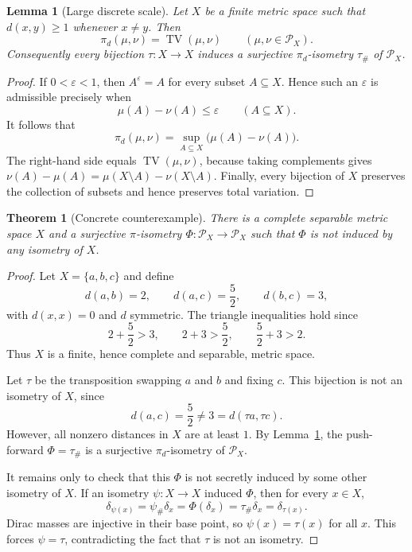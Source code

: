 \documentclass[11pt]{article}
\newtheorem{theorem}{Theorem}
\newtheorem{lemma}{Lemma}
\newcommand{\PX}{\mathcal P_X}
\newcommand{\TV}{\operatorname{TV}}
\begin{document}
\begin{lemma}[Large discrete scale]\label{lem:tv}
Let \(X\) be a finite metric space such that \(d(x,y)\ge 1\) whenever
\(x\ne y\).  Then
\[
  \pi_d(\mu,\nu)=\TV(\mu,\nu)\qquad(\mu,\nu\in\PX).
\]
Consequently every bijection \(\tau:X\to X\) induces a surjective
\(\pi_d\)-isometry \(\tau_\#\) of \(\PX\).
\end{lemma}

\begin{proof}
If \(0<\varepsilon<1\), then \(A^\varepsilon=A\) for every subset \(A\subseteq
X\).  Hence such an \(\varepsilon\) is admissible precisely when
\[
  \mu(A)-\nu(A)\le \varepsilon\qquad(A\subseteq X).
\]
It follows that
\[
  \pi_d(\mu,\nu)=\sup_{A\subseteq X}\bigl(\mu(A)-\nu(A)\bigr).
\]
The right-hand side equals \(\TV(\mu,\nu)\), because taking complements gives
\(\nu(A)-\mu(A)=\mu(X\setminus A)-\nu(X\setminus A)\).  Finally, every
bijection of \(X\) preserves the collection of subsets and hence preserves
total variation.
\end{proof}

\begin{theorem}[Concrete counterexample]\label{thm:counterexample}
There is a complete separable metric space \(X\) and a surjective
\(\pi\)-isometry \(\Phi:\PX\to\PX\) such that \(\Phi\) is not induced by any
isometry of \(X\).
\end{theorem}

\begin{proof}
Let \(X=\{a,b,c\}\) and define
\[
  d(a,b)=2,\qquad d(a,c)=\frac52,\qquad d(b,c)=3,
\]
with \(d(x,x)=0\) and \(d\) symmetric.  The triangle inequalities hold since
\[
  2+\frac52>3,\qquad 2+3>\frac52,\qquad \frac52+3>2.
\]
Thus \(X\) is a finite, hence complete and separable, metric space.

Let \(\tau\) be the transposition swapping \(a\) and \(b\) and fixing \(c\).
This bijection is not an isometry of \(X\), since
\[
  d(a,c)=\frac52\ne 3=d(\tau a,\tau c).
\]
However, all nonzero distances in \(X\) are at least \(1\).  By
Lemma~\ref{lem:tv}, the push-forward \(\Phi=\tau_\#\) is a surjective
\(\pi_d\)-isometry of \(\PX\).

It remains only to check that this \(\Phi\) is not secretly induced by some
other isometry of \(X\).  If an isometry \(\psi:X\to X\) induced \(\Phi\), then
for every \(x\in X\),
\[
  \delta_{\psi(x)}
  =\psi_\#\delta_x
  =\Phi(\delta_x)
  =\tau_\#\delta_x
  =\delta_{\tau(x)}.
\]
Dirac masses are injective in their base point, so \(\psi(x)=\tau(x)\) for
all \(x\).  This forces \(\psi=\tau\), contradicting the fact that \(\tau\) is
not an isometry.
\end{proof}
\end{document}
